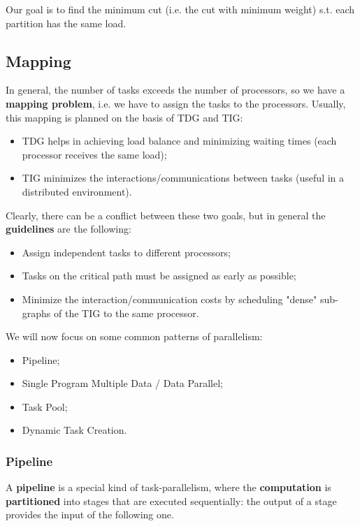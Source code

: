 Our goal is to find the minimum cut (i.e. the cut with minimum weight) s.t. each partition has the same load.

\subsection{Mapping}
In general, the number of tasks exceeds the number of processors, so we have a \textbf{mapping problem}, i.e. we have to assign the tasks to the processors. Usually, this mapping is planned on the basis of TDG and TIG:

\begin{itemize}
    \item TDG helps in achieving load balance and minimizing waiting times (each processor receives the same load);
    \item TIG minimizes the interactions/communications between tasks (useful in a distributed environment).
\end{itemize}

Clearly, there can be a conflict between these two goals, but in general the \textbf{guidelines} are the following:

\begin{itemize}
    \item Assign independent tasks to different processors;
    \item Tasks on the critical path must be assigned as early as possible;
    \item Minimize the interaction/communication costs by scheduling "dense" sub-graphs of the TIG to the same processor.
\end{itemize}

We will now focus on some common patterns of parallelism:
\begin{itemize}
    \item Pipeline;
    \item Single Program Multiple Data / Data Parallel;
    \item Task Pool;
    \item Dynamic Task Creation.
\end{itemize}

\subsubsection{Pipeline}
A \textbf{pipeline} is a special kind of task-parallelism, where the \textbf{computation} is \textbf{partitioned} into stages that are executed sequentially: the output of a stage provides the input of the following one. 

